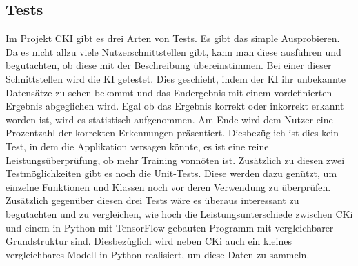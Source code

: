 \subsection{Tests}
\label{sec:DesignTests}
Im Projekt CKI gibt es drei Arten von Tests. Es gibt das simple Ausprobieren. Da es nicht allzu viele Nutzerschnittstellen gibt, kann man diese ausführen und begutachten, ob diese mit der Beschreibung übereinstimmen.
Bei einer dieser Schnittstellen wird die KI getestet. Dies geschieht, indem der KI ihr unbekannte Datensätze zu sehen bekommt und das Endergebnis mit einem vordefinierten Ergebnis abgeglichen wird.
Egal ob das Ergebnis korrekt oder inkorrekt erkannt worden ist, wird es statistisch aufgenommen. Am Ende wird dem Nutzer eine Prozentzahl der korrekten Erkennungen präsentiert. Diesbezüglich ist dies kein Test, in dem die Applikation versagen könnte, es ist eine reine Leistungsüberprüfung, ob mehr Training vonnöten ist.
Zusätzlich zu diesen zwei Testmöglichkeiten gibt es noch die Unit-Tests. Diese werden dazu genützt, um einzelne Funktionen und Klassen noch vor deren Verwendung zu überprüfen.
\\
Zusätzlich gegenüber diesen drei Tests wäre es überaus interessant zu begutachten und zu vergleichen, wie hoch die Leistungsunterschiede zwischen CKi und einem in Python mit TensorFlow gebauten Programm mit vergleichbarer Grundstruktur sind. Diesbezüglich wird neben CKi auch ein kleines vergleichbares Modell in Python realisiert, um diese Daten zu sammeln.



